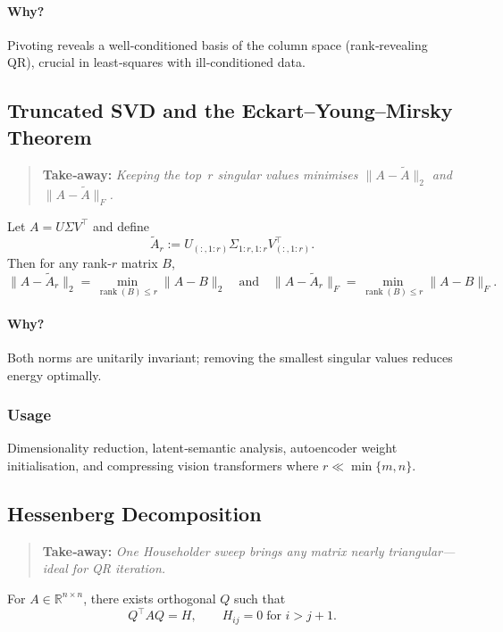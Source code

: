 \paragraph{Why?}
Pivoting reveals a well‑conditioned basis of the column space (rank‑revealing QR), crucial in least‑squares with ill‑conditioned data.

\subsection{Truncated SVD and the Eckart–Young–Mirsky Theorem}
\begin{quote}
\textbf{Take‑away:} \emph{Keeping the top $r$ singular values minimises $\|A-\tilde A\|_2$ and $\|A-\tilde A\|_F$.}
\end{quote}

Let $A=U\Sigma V^\top$ and define
\[
\tilde A_r := U_{(:,1:r)}\Sigma_{1:r,1:r}V_{(:,1:r)}^\top.
\]
Then for any rank‑$r$ matrix $B$,
\[
\|A-\tilde A_r\|_2 = \min_{\operatorname{rank}(B)\le r}\|A-B\|_2
\quad\text{and}\quad
\|A-\tilde A_r\|_F = \min_{\operatorname{rank}(B)\le r}\|A-B\|_F.
\]

\paragraph{Why?}
Both norms are unitarily invariant; removing the smallest singular values reduces energy optimally.

\subsubsection*{Usage}
Dimensionality reduction, latent‑semantic analysis, autoencoder weight initialisation, and compressing vision transformers where $r\!\ll\!\min\{m,n\}$.

\subsection{Hessenberg Decomposition}
\begin{quote}
\textbf{Take‑away:} \emph{One Householder sweep brings any matrix nearly triangular—ideal for QR iteration.}
\end{quote}

For $A\in\mathbb R^{n\times n}$, there exists orthogonal $Q$ such that
\[
Q^\top A Q = H,\qquad
H_{ij}=0\;\text{for }i>j+1.
\]

